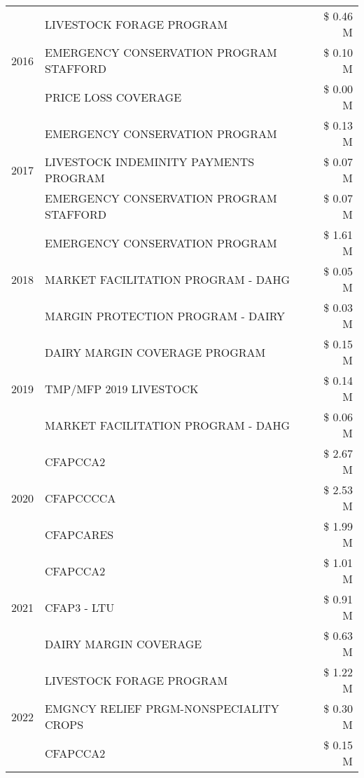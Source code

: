 \begin{tabular}{llr}
\cline{1-3}
\multirow[t]{3}{*}{2016} & LIVESTOCK FORAGE PROGRAM & \$ 0.46 M \\
 & EMERGENCY CONSERVATION PROGRAM STAFFORD & \$ 0.10 M \\
 & PRICE LOSS COVERAGE & \$ 0.00 M \\
\cline{1-3}
\multirow[t]{3}{*}{2017} & EMERGENCY CONSERVATION PROGRAM & \$ 0.13 M \\
 & LIVESTOCK INDEMINITY PAYMENTS PROGRAM & \$ 0.07 M \\
 & EMERGENCY CONSERVATION PROGRAM STAFFORD & \$ 0.07 M \\
\cline{1-3}
\multirow[t]{3}{*}{2018} & EMERGENCY CONSERVATION PROGRAM & \$ 1.61 M \\
 & MARKET FACILITATION PROGRAM - DAHG & \$ 0.05 M \\
 & MARGIN PROTECTION PROGRAM - DAIRY & \$ 0.03 M \\
\cline{1-3}
\multirow[t]{3}{*}{2019} & DAIRY MARGIN COVERAGE PROGRAM & \$ 0.15 M \\
 & TMP/MFP 2019 LIVESTOCK & \$ 0.14 M \\
 & MARKET FACILITATION PROGRAM - DAHG & \$ 0.06 M \\
\cline{1-3}
\multirow[t]{3}{*}{2020} & CFAPCCA2 & \$ 2.67 M \\
 & CFAPCCCCA & \$ 2.53 M \\
 & CFAPCARES & \$ 1.99 M \\
\cline{1-3}
\multirow[t]{3}{*}{2021} & CFAPCCA2 & \$ 1.01 M \\
 & CFAP3 - LTU & \$ 0.91 M \\
 & DAIRY MARGIN COVERAGE & \$ 0.63 M \\
\cline{1-3}
\multirow[t]{3}{*}{2022} & LIVESTOCK FORAGE PROGRAM & \$ 1.22 M \\
 & EMGNCY RELIEF PRGM-NONSPECIALITY CROPS & \$ 0.30 M \\
 & CFAPCCA2 & \$ 0.15 M \\
\cline{1-3}
\bottomrule
\end{tabular}
